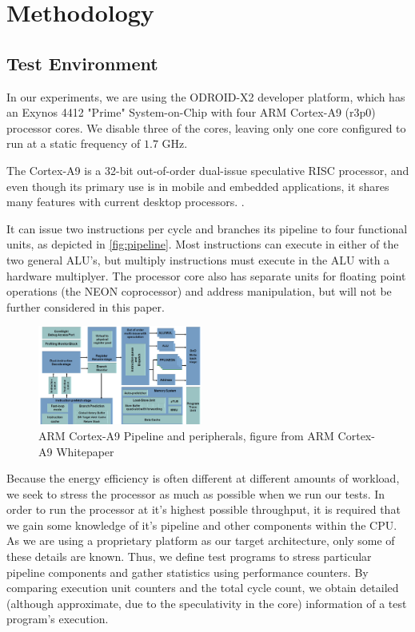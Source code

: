 \section{Methodology}


\subsection{Test Environment}
In our experiments, we are using the ODROID-X2 \cite{odroid-x2} developer
platform, which has an Exynos 4412 "Prime" System-on-Chip with four ARM
Cortex-A9 (r3p0) processor cores. We disable three of the cores, leaving only
one core configured to run at a static frequency of $1.7$ GHz.

The Cortex-A9 is a 32-bit out-of-order dual-issue speculative RISC processor,
and even though its primary use is in mobile and embedded applications, it
shares many features with current desktop processors. \cite{patterson}
\cite{hennessy}.

It can issue two instructions per cycle and branches its pipeline to four
functional units, as depicted in \autoref{fig:pipeline}. Most instructions can
execute in either of the two general ALU's, but multiply instructions must
execute in the ALU with a hardware multiplyer. The processor core also has
separate units for floating point operations (the NEON coprocessor) and address
manipulation, but will not be further considered in this paper.

\begin{figure}
    \begin{centering}
        \includegraphics[width=0.48\textwidth]{figures/A9-Pipeline-hres}
        \caption{ARM Cortex-A9 Pipeline and peripherals,\hfill
        figure from ARM Cortex-A9 Whitepaper\cite{a9whitepaper}}
        \label{fig:pipeline}
    \end{centering}
\end{figure}

Because the energy efficiency is often different at different amounts of
workload, we seek to stress the processor as much as possible when we run our
tests. In order to run the processor at it's highest possible throughput, it is
required that we gain some knowledge of it's pipeline and other components
within the CPU. As we are using a proprietary platform as our target
architecture, only some of these details are known. Thus, we define test
programs to stress particular pipeline components and gather statistics using
performance counters. By comparing execution unit counters and the total cycle
count, we obtain detailed (although approximate, due to the speculativity in the
core) information of a test program's execution. 

